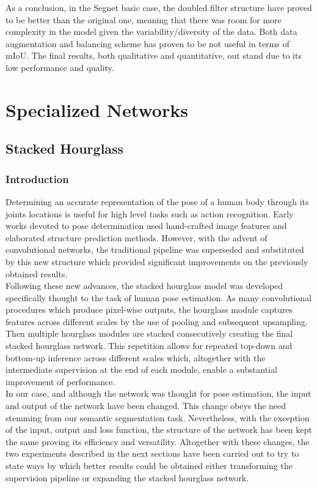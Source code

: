 As a conclusion, in the Segnet basic case, the doubled filter structure have proved to be better than the original one, meaning that there was room for more complexity in the model given the variability/diversity of the data. Both data augmentation and balancing scheme has proven to be not useful in terms of mIoU. The final results, both qualitative and quantitative, out stand due to its low performance and quality.\newline
 
 
\newpage
\section{Specialized Networks}\label{specificstudy}


\subsection{Stacked Hourglass}

\subsubsection{Introduction}

Determining an accurate representation of the pose of a human body through its joints locations is useful for high level tasks such as action recognition. Early works devoted to pose determination used hand-crafted image features and elaborated structure prediction methods. However, with the advent of convolutional networks, the traditional pipeline was superseded and substituted by this new structure which provided significant improvements on the previously obtained results.\\

Following these new advances, the stacked hourglass model was developed specifically thought to the task of human pose estimation. As many convolutional procedures which produce pixel-wise outputs, the hourglass module captures features across different scales by the use of pooling and subsequent upsampling. Then multiple hourglass modules are stacked consecutively creating the final stacked hourglass network. This repetition allows for repeated top-down and bottom-up inference across different scales which, altogether with the intermediate supervision at the end of each module, enable a substantial improvement of performance.\\

In our case, and although the network was thought for pose estimation, the input and output of the network have been changed. This change obeys the need stemming from our semantic segmentation task. Nevertheless, with the exception of the input, output and loss function, the structure of the network has been kept the same proving its efficiency and versatility. Altogether with these changes, the two experiments described in the next sections have been carried out to try to state ways by which better results could be obtained either transforming the supervision pipeline or expanding the stacked hourglass network.\\

